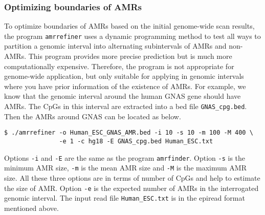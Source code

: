 \documentclass[10pt]{article}
\newcommand{\prog}[1]{\texttt{#1}}
\newcommand{\fn}[1]{\texttt{#1}}
\newcommand{\op}[1]{\texttt{#1}}
\begin{document}
\subsubsection{Optimizing boundaries of AMRs}
To optimize boundaries of AMRs based on the initial genome-wide scan results, the program \prog{amrrefiner} uses a dynamic programming method to test all ways to partition a genomic interval into alternating subintervals of AMRs and non-AMRs. This program provides more precise prediction but is much more computationally expensive. Therefore, the program is not appropriate for genome-wide application, but only suitable for applying in genomic intervals where you have prior information of the existence of AMRs. For example, we know that the genomic interval around the human GNAS gene should have AMRs. The CpGs in this interval are extracted into a bed file \fn{GNAS\_cpg.bed}. Then the AMRs around GNAS can be located as below.
\begin{verbatim}
$ ./amrrefiner -o Human_ESC_GNAS_AMR.bed -i 10 -s 10 -m 100 -M 400 \
               -e 1 -c hg18 -E GNAS_cpg.bed Human_ESC.txt
\end{verbatim}
Options \op{-i} and \op{-E} are the same as the program \prog{amrfinder}. Option \op{-s} is the minimum AMR size, \op{-m} is the mean AMR size and \op{-M} is the maximum AMR size. All these three options are in terms of number of CpGs and help to estimate the size of AMR. Option \op{-e} is the expected number of AMRs in the interrogated genomic interval. The input read file \fn{Human\_ESC.txt} is in the epiread format mentioned above.


\end{document}
